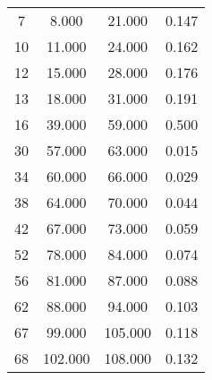 % 
\begin{tabular}{cccc}
  \hline
  \hline
7 & 8.000 & 21.000 & 0.147 \\ 
  10 & 11.000 & 24.000 & 0.162 \\ 
  12 & 15.000 & 28.000 & 0.176 \\ 
  13 & 18.000 & 31.000 & 0.191 \\ 
  16 & 39.000 & 59.000 & 0.500 \\ 
  30 & 57.000 & 63.000 & 0.015 \\ 
  34 & 60.000 & 66.000 & 0.029 \\ 
  38 & 64.000 & 70.000 & 0.044 \\ 
  42 & 67.000 & 73.000 & 0.059 \\ 
  52 & 78.000 & 84.000 & 0.074 \\ 
  56 & 81.000 & 87.000 & 0.088 \\ 
  62 & 88.000 & 94.000 & 0.103 \\ 
  67 & 99.000 & 105.000 & 0.118 \\ 
  68 & 102.000 & 108.000 & 0.132 \\ 
   \hline
\end{tabular}
